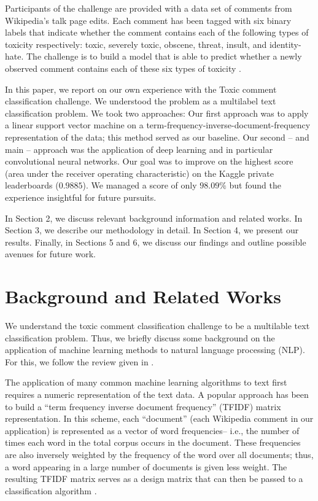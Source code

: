 \documentclass[12pt]{article}
\begin{document}
Participants of the challenge are provided with a data set of comments from Wikipedia's talk page edits. Each comment has been tagged with six binary labels that indicate whether the comment contains each of the following types of toxicity respectively: toxic, severely toxic, obscene, threat, insult, and identity-hate. The challenge is to build a model that is able to predict whether a newly observed comment contains each of these six types of toxicity \cite{kaggle}.

In this paper, we report on our own experience with the Toxic comment classification challenge. We understood the problem as a multilabel text classification problem. We took two approaches: Our first approach was to apply a linear support vector machine on a term-frequency-inverse-document-frequency representation of the data; this method served as our baseline. Our second -- and main -- approach was the application of deep learning and in particular convolutional neural networks. Our goal was to improve on the highest score (area under the receiver operating characteristic) on the Kaggle private leaderboards ($0.9885$). We managed a score of only $98.09\%$ but found the experience insightful for future pursuits.

In Section 2, we discuss relevant background information and related works. In Section 3, we describe our methodology in detail. In Section 4, we present our results. Finally, in Sections 5 and 6, we discuss our findings and outline possible avenues for future work.


\section{Background and Related Works}

We understand the toxic comment classification challenge to be a multilable text classification problem. Thus, we briefly discuss some background on the application of machine learning methods to natural language processing (NLP). For this, we follow the review given in \cite{young2017recent}.

The application of many common machine learning algorithms to text first requires a numeric representation of the text data. A popular approach has been to build a ``term frequency inverse document frequency'' (TFIDF) matrix representation. In this scheme, each ``document'' (each Wikipedia comment in our application) is represented as a vector of word frequencies-- i.e., the number of times each word in the total corpus occurs in the document. These frequencies are also inversely weighted by the frequency of the word over all documents; thus, a word appearing in a large number of documents is given less weight. The resulting TFIDF matrix serves as a design matrix that can then be passed to a classification algorithm \cite{sparck1972statistical}.
\end{document}
